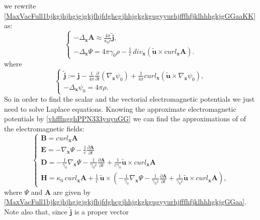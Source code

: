 \documentclass{article}
\theoremstyle{definition}
\theoremstyle{remark}
\renewcommand{\vec}[1]{\mathbf{#1}}
\newcommand{\R}{\mathbb{R}}
\newcommand{\er}{\eqref}
\newcommand{\R}{{\mathbb{R}}}
\newcommand{\er}{\eqref}
\begin{document}
we rewrite
\er{MaxVacFull1bjkgjhjhgjgjgkjfhjfdghcgjhhjgkgkgugyyurhjfffhfjklhhhgkjgGGaaKK}
as:
\begin{equation}\label{MaxVacFull1bjkgjhjhgjgjgkjfhjfdghcgjhhjgkgkgugyyurhjfffhfjklhhhgkjgGGaa}
\begin{cases}
-\Delta_{\vec x}\vec A \approx\frac{4\pi}{\kappa_0 c}\vec {\widetilde j},\\
-\Delta_{\vec x}\Psi= 4\pi\gamma_0\rho-\frac{1}{c}\,div_{\vec
x}\left(\vec {\tilde u}\times curl_{\vec x} \vec A\right).
\end{cases}
\end{equation}
where
\begin{equation}\label{reducedcurrentfhfhjfhjGGaakklkl}
\begin{cases}
\vec {\widetilde j}:=\vec j-\frac{1}{4\pi}\frac{\partial}{\partial
t} \left(\nabla_{\vec x}\psi_0\right)+\frac{1}{4\pi}curl_{\vec
x}\left(\vec {\tilde u}\times \nabla_{\vec x}\psi_0\right),\\
-\Delta_{\vec x}\psi_0= 4\pi\rho.
\end{cases}
\end{equation}
So in order to find the scalar and the vectorial electromagnetic
potentials we just need to solve Laplace equations. Knowing the
approximate electromagnetic potentials by \er{vhfffngghPPN333yuyuGG}
we can find the approximations of of the electromagnetic fields:
\begin{equation}\label{MaxVacFull1bjkgjhjhgjgjgkjfhjfdghghligioiuittrhiguffGGaa}
\begin{cases}
\vec B= curl_{\vec x} \vec A\\
\vec E=-\nabla_{\vec x}\Psi-\frac{1}{c}\frac{\partial\vec
A}{\partial t}\\
 \vec D=-\frac{1}{\gamma_0}\nabla_{\vec
x}\Psi-\frac{1}{\gamma_0 c}\frac{\partial\vec A}{\partial t}+\frac{1}{c\gamma_0}\vec {\tilde u}\times curl_{\vec x}\vec A\\
\vec H=\kappa_0 \,curl_{\vec x} \vec A+\frac{1}{c}\,\vec {\tilde
u}\times\left(-\frac{1}{\gamma_0}\nabla_{\vec
x}\Psi-\frac{1}{\gamma_0 c}\frac{\partial\vec A}{\partial
t}+\frac{1}{\gamma_0 c}\vec {\tilde u}\times curl_{\vec x}\vec
A\right),
\end{cases}
\end{equation}
where $\Psi$ and $\vec A$ are given by
\er{MaxVacFull1bjkgjhjhgjgjgkjfhjfdghcgjhhjgkgkgugyyurhjfffhfjklhhhgkjgGGaa}.
Note also that, since $\vec {\widetilde j}$ is a proper vector
\end{document}
